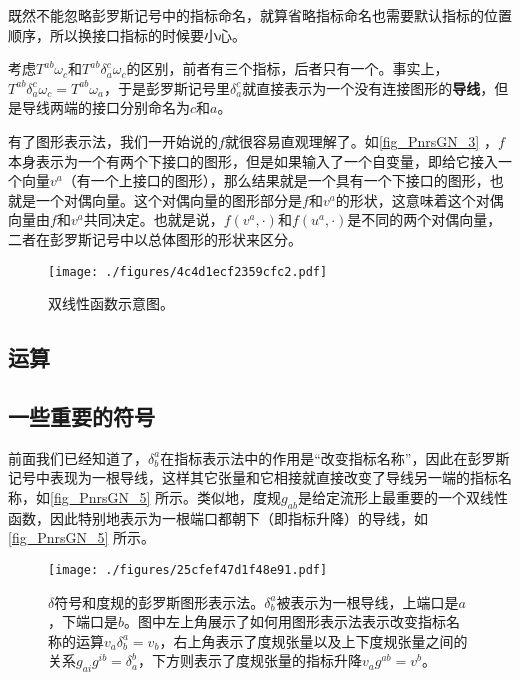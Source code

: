 既然不能忽略彭罗斯记号中的指标命名，就算省略指标命名也需要默认指标的位置顺序，所以换接口指标的时候要小心。

考虑$T^{ab}\omega_{c}$和$T^{ab}\delta^c_a\omega_{c}$的区别，前者有三个指标，后者只有一个。事实上，$T^{ab}\delta^c_a\omega_{c} = T^{ab}\omega_{a}$，于是彭罗斯记号里$\delta^c_a$就直接表示为一个没有连接图形的\textbf{导线}，但是导线两端的接口分别命名为$c$和$a$。


有了图形表示法，我们一开始说的$f$就很容易直观理解了。如\autoref{fig_PnrsGN_3} ，$f$本身表示为一个有两个下接口的图形，但是如果输入了一个自变量，即给它接入一个向量$v^a$（有一个上接口的图形），那么结果就是一个具有一个下接口的图形，也就是一个对偶向量。这个对偶向量的图形部分是$f$和$v^a$的形状，这意味着这个对偶向量由$f$和$v^a$共同决定。也就是说，$f(v^a, \cdot)$和$f(u^a, \cdot)$是不同的两个对偶向量，二者在彭罗斯记号中以总体图形的形状来区分。

\begin{figure}[ht]
\centering
\texttt{[image: ./figures/4c4d1ecf2359cfc2.pdf]}
\caption{双线性函数示意图。} \label{fig_PnrsGN_3}
\end{figure}



\subsection{运算}











\subsection{一些重要的符号}


前面我们已经知道了，$\delta_b^a$在指标表示法中的作用是“改变指标名称”，因此在彭罗斯记号中表现为一根导线，这样其它张量和它相接就直接改变了导线另一端的指标名称，如\autoref{fig_PnrsGN_5} 所示。类似地，度规$g_{ab}$是给定流形上最重要的一个双线性函数，因此特别地表示为一根端口都朝下（即指标升降）的导线，如\autoref{fig_PnrsGN_5} 所示。






\begin{figure}[ht]
\centering
\texttt{[image: ./figures/25cfef47d1f48e91.pdf]}
\caption{$\delta$符号和度规的彭罗斯图形表示法。$\delta^a_b$被表示为一根导线，上端口是$a$，下端口是$b$。图中左上角展示了如何用图形表示法表示改变指标名称的运算$v_a\delta^a_b=v_b$，右上角表示了度规张量以及上下度规张量之间的关系$g_{ai}g^{ib}=\delta^b_a$，下方则表示了度规张量的指标升降$v_ag^{ab}=v^b$。} \label{fig_PnrsGN_5}
\end{figure}


















